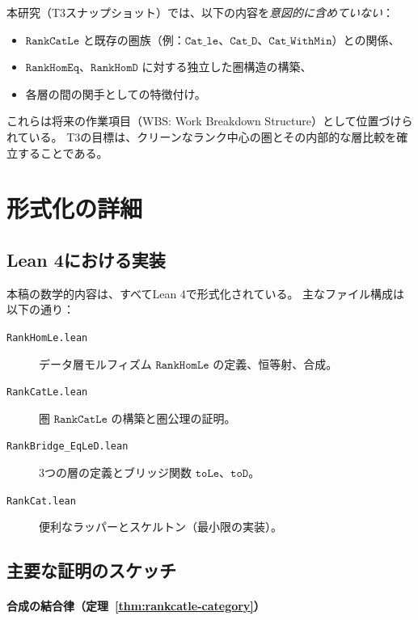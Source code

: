 \documentclass[11pt,a4paper,ja=standard]{bxjsarticle}
\theoremstyle{definition}
\newcommand{\RankHomLe}{\mathtt{RankHomLe}}
\newcommand{\RankHomEq}{\mathtt{RankHomEq}}
\newcommand{\RankHomD}{\mathtt{RankHomD}}
\newcommand{\RankCatLe}{\mathtt{RankCatLe}}
\begin{document}
本研究（T3スナップショット）では、以下の内容を\emph{意図的に含めていない}：

\begin{itemize}
\item $\RankCatLe$ と既存の圏族（例：$\mathtt{Cat\_le}$、$\mathtt{Cat\_D}$、$\mathtt{Cat\_WithMin}$）との関係、
\item $\RankHomEq$、$\RankHomD$ に対する独立した圏構造の構築、
\item 各層の間の関手としての特徴付け。
\end{itemize}

これらは将来の作業項目（WBS: Work Breakdown Structure）として位置づけられている。
T3の目標は、クリーンなランク中心の圏とその内部的な層比較を確立することである。

\section{形式化の詳細}

\subsection{Lean 4における実装}

本稿の数学的内容は、すべてLean 4で形式化されている。
主なファイル構成は以下の通り：

\begin{description}
\item[\texttt{RankHomLe.lean}]
データ層モルフィズム $\RankHomLe$ の定義、恒等射、合成。

\item[\texttt{RankCatLe.lean}]
圏 $\RankCatLe$ の構築と圏公理の証明。

\item[\texttt{RankBridge\_EqLeD.lean}]
3つの層の定義とブリッジ関数 $\mathtt{toLe}$、$\mathtt{toD}$。

\item[\texttt{RankCat.lean}]
便利なラッパーとスケルトン（最小限の実装）。
\end{description}

\subsection{主要な証明のスケッチ}

\paragraph{合成の結合律（定理~\ref{thm:rankcatle-category}）}
\end{document}
